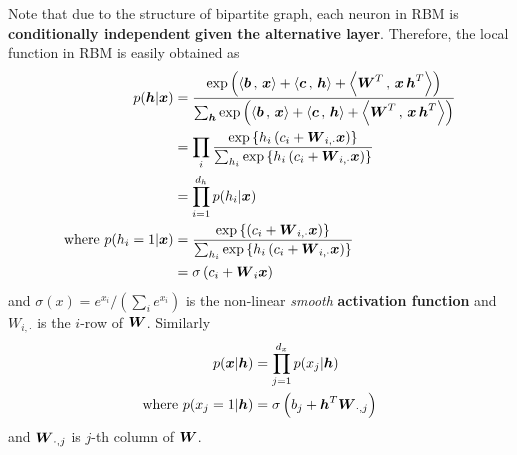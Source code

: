 \documentclass[11pt]{article}
\begin{document}
Note that due to the structure of bipartite graph, each neuron in RBM is \textbf{conditionally independent} \textbf{given the alternative layer}. Therefore, the local function in RBM is easily obtained as 
\begin{align}
p(\boldsymbol{h} | \boldsymbol{x}) &= \frac{\exp\left(\left\langle \boldsymbol{b}\,,\, \boldsymbol{x} \right\rangle + \left\langle \boldsymbol{c}\,,\, \boldsymbol{h} \right\rangle + \left\langle \boldsymbol{W}^{T}\,,\, \boldsymbol{x}\,\boldsymbol{h}^{T} \right\rangle\right)}{\sum_{\boldsymbol{h}}\exp\left(\left\langle \boldsymbol{b}\,,\, \boldsymbol{x} \right\rangle + \left\langle \boldsymbol{c}\,,\, \boldsymbol{h} \right\rangle + \left\langle \boldsymbol{W}^{T}\,,\, \boldsymbol{x}\,\boldsymbol{h}^{T} \right\rangle\right)} \nonumber\\
&= \prod_{i}\frac{\exp\left\{h_i \left(c_{i} +\boldsymbol{W}_{i,\cdot}\boldsymbol{x}\right)\right\}}{\sum_{h_i}\exp\left\{h_i \left(c_{i} + \boldsymbol{W}_{i,\cdot}\boldsymbol{x}\right)\right\}} \nonumber\\
&=  \prod_{i=1}^{d_h}p(h_i | \boldsymbol{x}) \label{eqn: rbm_decomp}\\
\text{where } p(h_i = 1 | \boldsymbol{x})&= \frac{\exp\left\{\left(c_{i} + \boldsymbol{W}_{i,\cdot}\boldsymbol{x}\right)\right\}}{\sum_{h_i}\exp\left\{h_i \left(c_{i} + \boldsymbol{W}_{i,\cdot}\boldsymbol{x}\right)\right\}} \nonumber\\
&= \sigma\left(c_{i} + \boldsymbol{W}_i\boldsymbol{x}\right) \label{eqn: rbm_h_activate}
\end{align} and $\sigma(x) = e^{x_i}/(\sum_i e^{x_i})$ is the non-linear \emph{smooth} \textbf{activation function} and $W_{i,\cdot}$ is the $i$-row of $\boldsymbol{W}$. Similarly
\begin{align}
p(\boldsymbol{x} | \boldsymbol{h}) &= \prod_{j=1}^{d_x}p(x_j | \boldsymbol{h}) \label{eqn: rbm_decomp2}\\
\text{where } p(x_j = 1 | \boldsymbol{h})&= \sigma\left(b_{j} + \boldsymbol{h}^{T}\boldsymbol{W}_{\cdot, j}\right)  \label{eqn: rbm_x_activate}
\end{align} and $\boldsymbol{W}_{\cdot, j}$ is $j$-th column of $\boldsymbol{W}$.



\newpage


\end{document}
